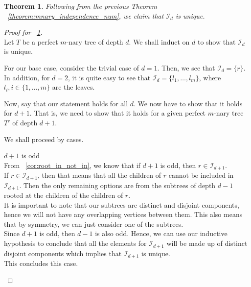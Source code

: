 \documentclass{amsart}
\newtheorem{theorem}{Theorem}[section]
\theoremstyle{definition}
\begin{document}
\begin{theorem}\label{theorem:unique_independence_num}
	Following from the previous Theorem ~\ref{theorem:mnary_independence_num}, we claim that $\mathcal{I}_d$ is unique.
\end{theorem}
\begin{proof}[Proof for ~\ref{theorem:unique_independence_num}]
	$ $ \\

	Let $T$ be a perfect $m$-nary tree of depth $d$. We shall induct on $d$ to show that $\mathcal{I}_d$ is unique.

	For our base case, consider the trivial case of $d = 1$. Then, we see that $\mathcal{I}_d = \{r\}$. In addition, for $d = 2$, it is quite easy to see that $\mathcal{I}_d = \{l_1,\dots, l_m\}$, where $l_i, i \in \{1,\dots, m\}$ are the leaves.

	Now, say that our statement holds for all $d$. We now have to show that it holds for $d + 1$. That is, we need to show that it holds for a given perfect $m$-nary tree $T'$ of depth $d + 1$.

	We shall proceed by cases.

	\begin{caseof}
		\item $d + 1$ is odd \\
		From ~\ref{cor:root_in_not_in}, we know that if $d + 1$ is odd, then $r \in \mathcal{I}_{d + 1}$.
		\\
		If $r \in \mathcal{I}_{d + 1}$, then that means that all the children of $r$ cannot be included in $\mathcal{I}_{d + 1}$. Then the only remaining options are from the subtrees of depth $d - 1$ rooted at the children of the children of $r$.
		\\
		It is important to note that our subtrees are distinct and disjoint components, hence we will not have any overlapping vertices between them. This also means that by symmetry, we can just consider one of the subtrees.
		\\
		Since $d + 1$ is odd, then $d - 1$ is also odd. Hence, we can use our inductive hypothesis to conclude that all the elements for $\mathcal{I}_{d + 1}$ will be made up of distinct disjoint components which implies that $\mathcal{I}_{d + 1}$ is unique.
		\\
		This concludes this case.


\end{caseof}
\end{proof}
\end{document}
